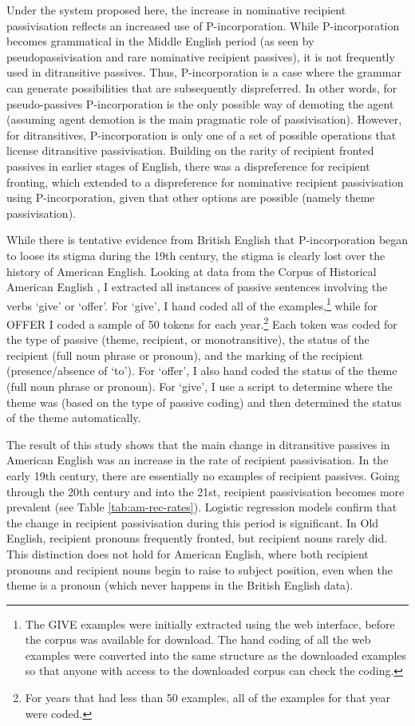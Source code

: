 	Under the system proposed here, the increase in nominative recipient passivisation reflects an increased use of P-incorporation. While P-incorporation becomes grammatical in the Middle English period (as seen by pseudopassivisation and rare nominative recipient passives), it is not frequently used in ditransitive passives. Thus, P-incorporation is a case where the grammar can generate possibilities that are subsequently dispreferred. In other words, for pseudo-passives P-incorporation is the only possible way of demoting the agent (assuming agent demotion is the main pragmatic role of passivisation). However, for ditransitives, P-incorporation is only one of a set of possible operations that license ditransitive passivisation. Building on the rarity of recipient fronted passives in earlier stages of English, there was a dispreference for recipient fronting, which extended to a dispreference for nominative recipient passivisation using P-incorporation, given that other options are possible (namely theme passivisation).

	While there is tentative evidence from British English that P-incorporation began to loose its stigma during the 19th century, the stigma is clearly lost over the history of American English. Looking at data from the Corpus of Historical American English \citep{Davies.2010}, I extracted all instances of passive sentences involving the verbs `give' or `offer'. For `give', I hand coded all of the examples,\footnote{The GIVE examples were initially extracted using the web interface, before the corpus was available for download. The hand coding of all the web examples were converted into the same structure as the downloaded examples so that anyone with access to the downloaded corpus can check the coding.} while for OFFER I coded a sample of 50 tokens for each year.\footnote{For years that had less than 50 examples, all of the examples for that year were coded.} Each token was coded for the type of passive (theme, recipient, or monotransitive), the status of the recipient (full noun phrase or pronoun), and the marking of the recipient (presence/absence of `to'). For `offer', I also hand coded the status of the theme (full noun phrase or pronoun). For `give', I use a script to determine where the theme was (based on the type of passive coding) and then determined the status of the theme automatically.

	
	The result of this study shows that the main change in ditransitive passives in American English was an increase in the rate of recipient passivisation. In the early 19th century, there are essentially no examples of recipient passives. Going through the 20th century and into the 21st, recipient passivisation becomes more prevalent (see Table \ref{tab:am-rec-rates}). Logistic regression models confirm that the change in recipient passivisation during this period is significant. In Old English, recipient pronouns frequently fronted, but recipient nouns rarely did. This distinction does not hold for American English, where both recipient pronouns and recipient nouns begin to raise to subject position, even when the theme is a pronoun (which never happens in the British English data).

